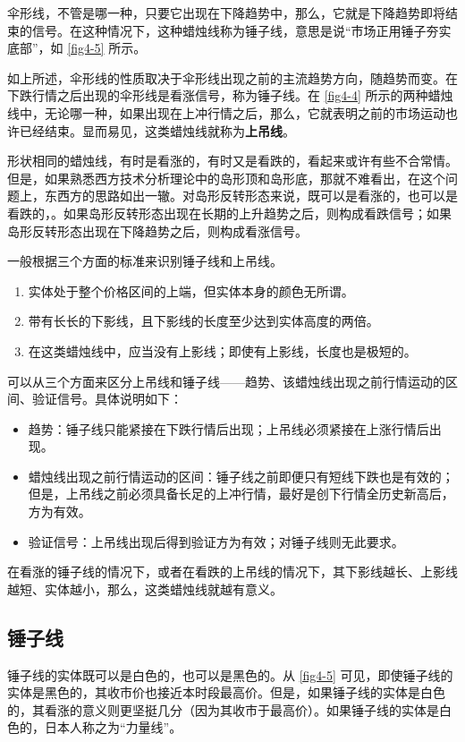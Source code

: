 
伞形线，不管是哪一种，只要它出现在下降趋势中，那么，它就是下降趋势即将结束的信号。在这种情况下，这种蜡烛线称为锤子线，意思是说“市场正用锤子夯实底部”，如 \autoref{fig4-5} 所示。


如上所述，伞形线的性质取决于伞形线出现之前的主流趋势方向，随趋势而变。在下跌行情之后出现的伞形线是看涨信号，称为锤子线。在 \autoref{fig4-4} 所示的两种蜡烛线中，无论哪一种，如果出现在上冲行情之后，那么，它就表明之前的市场运动也许已经结束。显而易见，这类蜡烛线就称为\textbf{上吊线}。

形状相同的蜡烛线，有时是看涨的，有时又是看跌的，看起来或许有些不合常情。但是，如果熟悉西方技术分析理论中的岛形顶和岛形底，那就不难看出，在这个问题上，东西方的思路如出一辙。对岛形反转形态来说，既可以是看涨的，也可以是看跌的，。如果岛形反转形态出现在长期的上升趋势之后，则构成看跌信号；如果岛形反转形态出现在下降趋势之后，则构成看涨信号。

一般根据三个方面的标准来识别锤子线和上吊线。
\begin{enumerate}
    \item 实体处于整个价格区间的上端，但实体本身的颜色无所谓。
    \item 带有长长的下影线，且下影线的长度至少达到实体高度的两倍。
    \item 在这类蜡烛线中，应当没有上影线；即使有上影线，长度也是极短的。
\end{enumerate}

可以从三个方面来区分上吊线和锤子线——趋势、该蜡烛线出现之前行情运动的区间、验证信号。具体说明如下：
\begin{itemize}
    \item 趋势：锤子线只能紧接在下跌行情后出现；上吊线必须紧接在上涨行情后出现。
    \item 蜡烛线出现之前行情运动的区间：锤子线之前即便只有短线下跌也是有效的；但是，上吊线之前必须具备长足的上冲行情，最好是创下行情全历史新高后，方为有效。
    \item 验证信号：上吊线出现后得到验证方为有效；对锤子线则无此要求。
\end{itemize}

在看涨的锤子线的情况下，或者在看跌的上吊线的情况下，其下影线越长、上影线越短、实体越小，那么，这类蜡烛线就越有意义。
\subsection{锤子线}
锤子线的实体既可以是白色的，也可以是黑色的。从 \autoref{fig4-5} 可见，即使锤子线的实体是黑色的，其收市价也接近本时段最高价。但是，如果锤子线的实体是白色的，其看涨的意义则更坚挺几分（因为其收市于最高价）。如果锤子线的实体是白色的，日本人称之为“力量线”。

